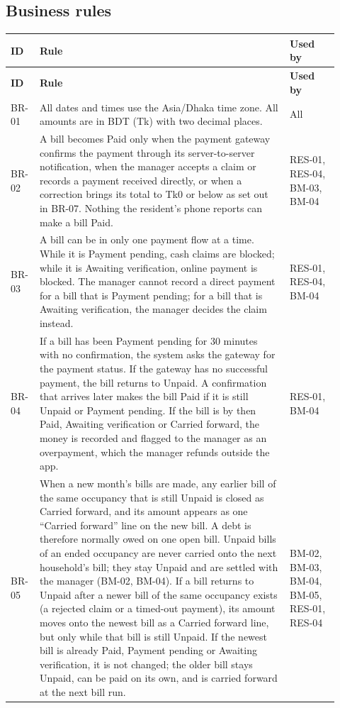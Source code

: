 \documentclass[11pt,a4paper]{report}
\newcommand{\taka}{Tk}
\newcommand{\taka}{{\bnfont\char"09F3}}
\begin{document}
\subsection{Business rules}

{\setlength{\LTpre}{6pt}\setlength{\LTpost}{6pt}
\begin{longtable}{>{\raggedright\arraybackslash}p{0.067\linewidth}>{\raggedright\arraybackslash}p{0.713\linewidth}>{\raggedright\arraybackslash}p{0.145\linewidth}}
\toprule
\textbf{ID} & \textbf{Rule} & \textbf{Used by} \\
\midrule
\endfirsthead
\toprule
\textbf{ID} & \textbf{Rule} & \textbf{Used by} \\
\midrule
\endhead
\bottomrule
\endlastfoot
BR-01 & All dates and times use the Asia/Dhaka time zone. All amounts are in BDT (\taka{}) with two decimal places. & All \\
BR-02 & A bill becomes Paid only when the payment gateway confirms the payment through its server-to-server notification, when the manager accepts a claim or records a payment received directly, or when a correction brings its total to \taka{}0 or below as set out in BR-07. Nothing the resident's phone reports can make a bill Paid. & RES-01, RES-04, BM-03, BM-04 \\
BR-03 & A bill can be in only one payment flow at a time. While it is Payment pending, cash claims are blocked; while it is Awaiting verification, online payment is blocked. The manager cannot record a direct payment for a bill that is Payment pending; for a bill that is Awaiting verification, the manager decides the claim instead. & RES-01, RES-04, BM-04 \\
BR-04 & If a bill has been Payment pending for 30 minutes with no confirmation, the system asks the gateway for the payment status. If the gateway has no successful payment, the bill returns to Unpaid. A confirmation that arrives later makes the bill Paid if it is still Unpaid or Payment pending. If the bill is by then Paid, Awaiting verification or Carried forward, the money is recorded and flagged to the manager as an overpayment, which the manager refunds outside the app. & RES-01, BM-04 \\
BR-05 & When a new month's bills are made, any earlier bill of the same occupancy that is still Unpaid is closed as Carried forward, and its amount appears as one ``Carried forward'' line on the new bill. A debt is therefore normally owed on one open bill. Unpaid bills of an ended occupancy are never carried onto the next household's bill; they stay Unpaid and are settled with the manager (BM-02, BM-04). If a bill returns to Unpaid after a newer bill of the same occupancy exists (a rejected claim or a timed-out payment), its amount moves onto the newest bill as a Carried forward line, but only while that bill is still Unpaid. If the newest bill is already Paid, Payment pending or Awaiting verification, it is not changed; the older bill stays Unpaid, can be paid on its own, and is carried forward at the next bill run. & BM-02, BM-03, BM-04, BM-05, RES-01, RES-04 \\

\end{longtable}}
\end{document}
